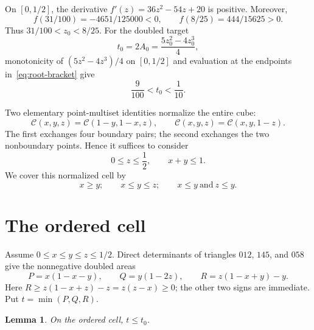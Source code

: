 \documentclass[11pt]{amsart}
\newtheorem{lemma}[theorem]{Lemma}
\theoremstyle{definition}
\newcommand{\CY}{\mathcal C}
\begin{document}
On $[0,1/2]$, the derivative
$f'(z)=36z^2-54z+20$ is positive.  Moreover,
\begin{equation}\label{eq:root-bracket}
 f(31/100)=-4651/125000<0,
 \qquad f(8/25)=444/15625>0.
\end{equation}
Thus $31/100<z_0<8/25$.  For the doubled target
\[
 t_0=2A_0=\frac{5z_0^2-4z_0^3}{4},
\]
monotonicity of $(5z^2-4z^3)/4$ on $[0,1/2]$ and evaluation at the endpoints
in~\eqref{eq:root-bracket} give
\begin{equation}\label{eq:t-bracket}
 \frac9{100}<t_0<\frac1{10}.
\end{equation}

Two elementary point-multiset identities normalize the entire cube:
\begin{equation}\label{eq:involutions}
 \CY(x,y,z)=\CY(1-y,1-x,z),\qquad
 \CY(x,y,z)=\CY(x,y,1-z).
\end{equation}
The first exchanges four boundary pairs; the second exchanges the two
nonboundary points.  Hence it suffices to consider
\begin{equation}\label{eq:normalized}
 0\le z\le\frac12,
 \qquad x+y\le1.
\end{equation}
We cover this normalized cell by
\begin{equation}\label{eq:split}
 x\ge y;\qquad x\le y\le z;\qquad
 x\le y\ \text{and}\ z\le y.
\end{equation}

\section{The ordered cell}

Assume $0\le x\le y\le z\le1/2$.  Direct determinants of triangles
$012$, $145$, and $058$ give the nonnegative doubled areas
\begin{equation}\label{eq:PQR}
 P=x(1-x-y),\qquad Q=y(1-2z),\qquad
 R=z(1-x+y)-y.
\end{equation}
Here \(R\ge z(1-x+z)-z=z(z-x)\ge0\); the other two signs are immediate.
Put $t=\min(P,Q,R)$.

\begin{lemma}\label{lem:ordered}
On the ordered cell, $t\le t_0$.
\end{lemma}
\end{document}
